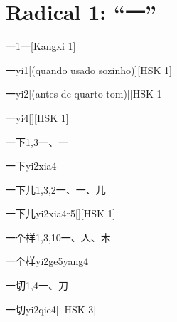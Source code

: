 
\section*{Radical 1: ``⼀''}

\begin{entry}{一}{1}{⼀}[Kangxi 1]
  \begin{phonetics}{一}{yi1}[(quando usado sozinho)][HSK 1]
  \end{phonetics}
  \begin{phonetics}{一}{yi2}[(antes de quarto tom)][HSK 1]
  \end{phonetics}
  \begin{phonetics}{一}{yi4}[][HSK 1]
  \end{phonetics}
\end{entry}

\begin{entry}{一下}{1,3}{⼀、⼀}
  \begin{phonetics}{一下}{yi2xia4}
  \end{phonetics}
\end{entry}

\begin{entry}{一下儿}{1,3,2}{⼀、⼀、⼉}
  \begin{phonetics}{一下儿}{yi2xia4r5}[][HSK 1]
  \end{phonetics}
\end{entry}

\begin{entry}{一个样}{1,3,10}{⼀、⼈、⽊}
  \begin{phonetics}{一个样}{yi2ge5yang4}
  \end{phonetics}
\end{entry}

\begin{entry}{一切}{1,4}{⼀、⼑}
  \begin{phonetics}{一切}{yi2qie4}[][HSK 3]
  \end{phonetics}
\end{entry}


